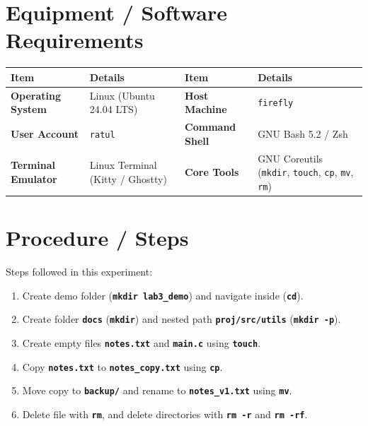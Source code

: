 \documentclass[10pt,a4paper]{article}
\newcommand{\cmd}[1]{\texttt{\textbf{#1}}}
\begin{document}
\section{Equipment / Software Requirements}
\vspace{-2pt}
\begin{table}[h!]
\centering\footnotesize
\renewcommand{\arraystretch}{1.08}
\begin{tabularx}{\linewidth}{lXlX}
\toprule
\textbf{Item} & \textbf{Details} & \textbf{Item} & \textbf{Details} \\
\midrule
\textbf{Operating System} & Linux (Ubuntu 24.04 LTS) & \textbf{Host Machine} & \texttt{firefly} \\
\textbf{User Account} & \texttt{ratul} & \textbf{Command Shell} & GNU Bash 5.2 / Zsh \\
\textbf{Terminal Emulator} & Linux Terminal (Kitty / Ghostty) & \textbf{Core Tools} & GNU Coreutils (\texttt{mkdir}, \texttt{touch}, \texttt{cp}, \texttt{mv}, \texttt{rm}) \\
\bottomrule
\end{tabularx}
\end{table}

\section{Procedure / Steps}
Steps followed in this experiment:
\begin{enumerate}[noitemsep,topsep=1pt,leftmargin=1.4em]
  \item Create demo folder (\cmd{mkdir lab3\_demo}) and navigate inside (\cmd{cd}).
  \item Create folder \cmd{docs} (\cmd{mkdir}) and nested path \cmd{proj/src/utils} (\cmd{mkdir -p}).
  \item Create empty files \cmd{notes.txt} and \cmd{main.c} using \cmd{touch}.
  \item Copy \cmd{notes.txt} to \cmd{notes\_copy.txt} using \cmd{cp}.
  \item Move copy to \cmd{backup/} and rename to \cmd{notes\_v1.txt} using \cmd{mv}.
  \item Delete file with \cmd{rm}, and delete directories with \cmd{rm -r} and \cmd{rm -rf}.
\end{enumerate}
\end{document}
